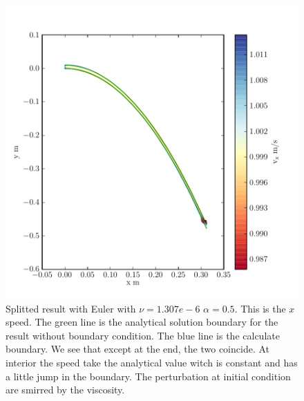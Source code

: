 \begin{figure}
	\includegraphics{topology/lateral_jet/plot_10__1_293.pdf}
			\caption{Splitted result with Euler with $\nu=1.307e-6$ $\alpha=0.5$.
	This is the $x$ speed.
	The green line is the analytical solution boundary for the result without boundary condition.
	The blue line is the calculate boundary.
	We see that except at the end, the two coincide.
	At interior the speed take the analytical value witch is constant and has a little jump in the boundary.
	The perturbation at initial condition are smirred by the viscosity.}
	\label{topo:extrap:lateral:10_1}
\end{figure}

